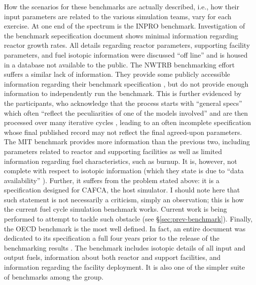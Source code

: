 How the scenarios for these benchmarks are actually described, i.e., how their
input parameters are related to the various simulation teams, vary for each
exercise. At one end of the spectrum is the INPRO benchmark. Investigation of
the benchmark sepecification document \cite{_international_2009} shows minimal
information regarding reactor growth rates. All details regarding reactor
parameters, supporting facility parameters, and fuel isotopic information were
discussed ``off line'' and is housed in a database not available to the
public. The NWTRB benchmarking effort suffers a similar lack of
information. They provide some publicly accessible information regarding their
benchmark specification \cite{abkowitz_scenario_2011}, but do not provide enough
information to independently run the benchmark. This is further evidenced by the
participants, who acknowledge that the process starts with ``general specs''
which often ``reflect the peculiarities of one of the models involved'' and are
then processed over many iterative cycles \cite{piet_vision_2011}, leading to an
often incomplete specification whose final published record may not reflect the
final agreed-upon parameters. The MIT benchmark provides more information than
the previous two, including parameters related to reactor and supporting
facilities as well as limited information regarding fuel characteristics, such
as burnup. It is, however, not complete with respect to isotopic information
(which they state is due to ``data availability''
\cite{guerin_benchmark_2009}). Further, it suffers from the problem stated
above: it is a specification designed for CAFCA, the host simulator. I should
note here that such statement is not necessarily a criticism, simply an
observation; this is how the current fuel cycle simulation benchmark
works. Current work is being performed to attempt to tackle such obstacle (see
\S\ref{sec:prev-benchmark}). Finally, the OECD benchmark is the most well
defined. In fact, an entire document was dedicated to its specification a full
four years prior to the release of the benchmarking results
\cite{boucher_specification_2008}. The benchmark includes isotopic details of
all input and output fuels, information about both reactor and support
facilities, and information regarding the facility deployment. It is also one of
the simpler suite of benchmarks among the group.

